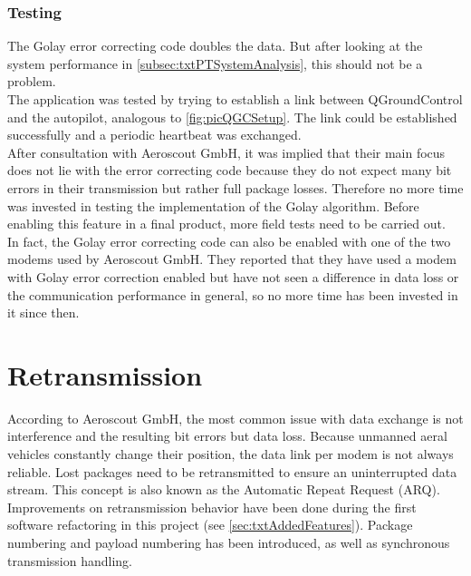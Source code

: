 \subsubsection{Testing}
The Golay error correcting code doubles the data. But after looking at the system performance in \autoref{subsec:txtPTSystemAnalysis}, this should not be a problem.\\
The application was tested by trying to establish a link between QGroundControl and the autopilot, analogous to \autoref{fig:picQGCSetup}. The link could be established successfully and a periodic heartbeat was exchanged.\\
After consultation with Aeroscout GmbH, it was implied that their main focus does not lie with the error correcting code because they do not expect many bit errors in their transmission but rather full package losses. Therefore no more time was invested in testing the implementation of the Golay algorithm. Before enabling this feature in a final product, more field tests need to be carried out.\\
In fact, the Golay error correcting code can also be enabled with one of the two modems used by Aeroscout GmbH. They reported that they have used a modem with Golay error correction enabled but have not seen a difference in data loss or the communication performance in general, so no more time has been invested in it since then. 
%
%
%
%
\section{Retransmission}
According to Aeroscout GmbH, the most common issue with data exchange is not interference and the resulting bit errors but data loss. Because unmanned aeral vehicles constantly change their position, the data link per modem is not always reliable. Lost packages need to be retransmitted to ensure an uninterrupted data stream. This concept is also known as the Automatic Repeat Request (ARQ). \\
Improvements on retransmission behavior have been done during the first software refactoring in this project (see \autoref{sec:txtAddedFeatures}). Package numbering and payload numbering has been introduced, as well as synchronous transmission handling.